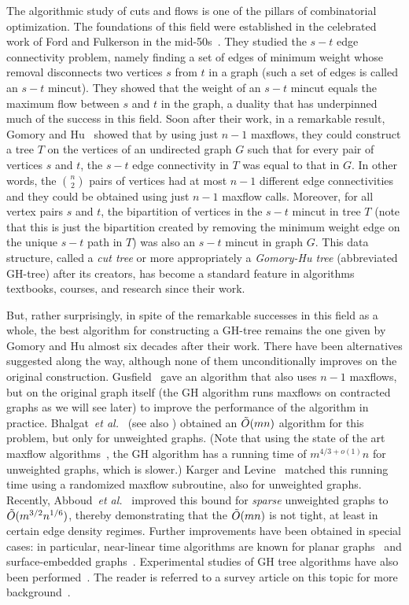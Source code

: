 The algorithmic study of cuts and flows is one of the pillars of combinatorial optimization. The foundations of this field were established 
in the celebrated work of Ford and Fulkerson in the mid-50s~\cite{FordF56}. They studied the $s-t$ edge connectivity problem, namely finding a set of edges of minimum weight whose removal disconnects two vertices $s$ from $t$ in a graph (such a set of edges is called an $s-t$ mincut). They showed that the weight of an $s-t$ mincut equals the maximum flow between $s$ and $t$ in the graph, a duality that has underpinned much of the success in this field. Soon after their work, in a remarkable result, Gomory and Hu~\cite{GomoryH61} showed that by using just $n-1$ maxflows, they could construct a tree $T$ on the vertices of an undirected graph $G$ such that for every pair of vertices $s$ and $t$, the $s-t$ edge connectivity in $T$ was equal to that in $G$. In other words, the $n\choose 2$ pairs of vertices had at most $n-1$ different edge connectivities and they could be obtained using just $n-1$ maxflow calls. Moreover, for all vertex pairs $s$ and $t$, the bipartition of vertices in the $s-t$ mincut in tree $T$ (note that this is just the bipartition created by removing the minimum weight edge on the unique $s-t$ path in $T$) was also an $s-t$ mincut in graph $G$. This data structure, called a {\em cut tree} or more appropriately a {\em Gomory-Hu tree} (abbreviated GH-tree) after its creators, has become a standard feature in algorithms textbooks, courses, and research since their work.

But, rather surprisingly, in spite of the remarkable successes in this field as a whole, the best algorithm for constructing a GH-tree remains the one given by Gomory and Hu almost six decades after their work. There have been alternatives suggested along the way, although none of them unconditionally improves on the original construction. Gusfield~\cite{Gusfield} gave an algorithm that also uses $n-1$ maxflows, but on the original graph itself (the GH algorithm runs maxflows on contracted graphs as we will see later) to improve the performance of the algorithm in practice. Bhalgat~{\em et al.}~\cite{BhalgatHKP08} (see also \cite{HariharanKP07}) obtained an $\tilde{O}(mn)$ algorithm for this problem, but only for unweighted graphs. (Note that using the state of the art maxflow algorithms~\cite{liu2020faster}, the GH algorithm has a running time of $m^{4/3+o(1)}n$ for unweighted graphs, which is slower.) Karger and Levine~\cite{KargerL} matched this running time using a randomized maxflow subroutine, also for unweighted graphs. Recently, Abboud~{\em et al.}~\cite{AbboudKT20a} improved this bound for {\em sparse} unweighted graphs to $\tilde{O}(m^{3/2}n^{1/6})$, thereby demonstrating that the $\tilde{O}(mn)$ is not tight, at least in certain edge density regimes. Further improvements have been obtained in special cases: in particular, near-linear time algorithms are known for planar graphs~\cite{BorradaileSW15} and surface-embedded graphs~\cite{BorradaileENW16}. Experimental studies of GH tree algorithms have also been performed~\cite{GoldbergT01}. The reader is referred to a survey article on this topic for more background~\cite{P16}.

